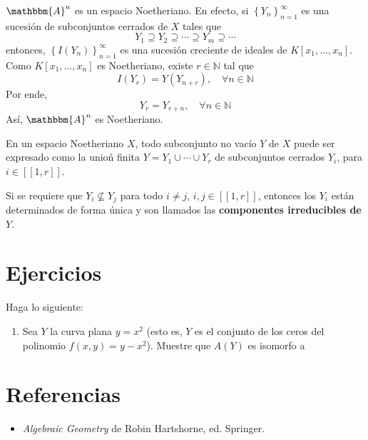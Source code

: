 \documentclass[12pt]{report}
\theoremstyle{largebreak}
\newcommand\natint[1]{\ensuremath{\left[\!\left[ #1\right]\!\right]}}
\newcommand{\bbm}[1]{\ensuremath{\mathbbm{#1}}}
\begin{document}
    \begin{exa}
        $\bbm{A}^n$ es un espacio Noetheriano. En efecto, si $\left\{Y_n \right\}_{ n=1}^\infty$ es una sucesión de subconjuntos cerrados de $X$ tales que
        \begin{equation*}
            Y_1\supseteq Y_2\supseteq\cdots\supseteq Y_m\supseteq\cdots
        \end{equation*}
        entonces, $\left\{I(Y_n) \right\}_{ n=1}^\infty$ es una sucesión creciente de ideales de $K[x_1,...,x_n]$. Como $K[x_1,...,x_n]$  es Noetheriano, existe $r\in\mathbb{N}$ tal que 
        \begin{equation*}
            I(Y_r)=Y(Y_{ n+r}),\quad\forall n\in\mathbb{N}
        \end{equation*}
        Por ende,
        \begin{equation*}
            Y_r=Y_{ r+n},\quad\forall n\in\mathbb{N}
        \end{equation*}
        Así, $\bbm{A}^n$ es Noetheriano.
    \end{exa}

    \begin{propo}
        En un espacio Noetheriano $X$, todo subconjunto no vacío $Y$ de $X$ puede ser expresado como la unioń finita $Y=Y_1\cup\cdots\cup Y_r$ de subconjuntos cerrados $Y_i$, para $i\in\natint{1,r}$.

        Si se requiere que $Y_i\nsubseteq Y_j$ para todo $i\neq j$, $i,j\in\natint{1,r}$, entonces los $Y_i$ están determinados de forma única y son llamados las \textbf{componentes irreducibles de $Y$}.
    \end{propo}

    \newpage

    \section{Ejercicios}

    \begin{excer}
        Haga lo siguiente:
        \begin{enumerate}[label=(\textit{\alph*})]
            \item Sea $Y$ la curva plana $y=x^2$ (esto es, $Y$ es el conjunto de los ceros del polinomio $f(x,y)=y-x^2$). Muestre que $A(Y)$ es isomorfo a 
        \end{enumerate}
    \end{excer}

    \newpage

    \section{Referencias}

    \begin{itemize}
        \item \textit{Algebraic Geometry} de Robin Hartshorne, ed. Springer.
    \end{itemize}
\end{document}
